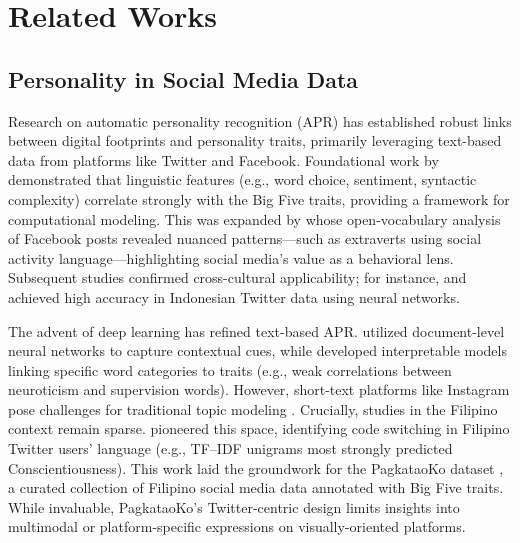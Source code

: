 %
%
%                 

\chapter{Related Works}
\label{sec:Related Works}


\section{Personality in Social Media Data}
\label{sec:Personality}
Research on automatic personality recognition (APR) has established robust links between digital footprints and personality traits, primarily leveraging text-based data from platforms like Twitter and Facebook. Foundational work by \citet{mairesse_using_2007} demonstrated that linguistic features (e.g., word choice, sentiment, syntactic complexity) correlate strongly with the Big Five traits, providing a framework for computational modeling. This was expanded by \citet{schwartz_personality_2013} whose open-vocabulary analysis of Facebook posts revealed nuanced patterns—such as extraverts using social activity language—highlighting social media's value as a behavioral lens. Subsequent studies confirmed cross-cultural applicability; for instance, \citet{adi_optimization_2018} and \citet{jeremy_automatic_2021} achieved high accuracy in Indonesian Twitter data using neural networks.

The advent of deep learning has refined text-based APR. \citet{majumder_deep_2017} utilized document-level neural networks to capture contextual cues, while \citet{han_knowledge_2020} developed interpretable models linking specific word categories to traits (e.g., weak correlations between neuroticism and supervision words). However, short-text platforms like Instagram pose challenges for traditional topic modeling \citep{albalawi_using_2020}. Crucially, studies in the Filipino context remain sparse. \citet{tighe_modeling_2018} pioneered this space, identifying code switching in Filipino Twitter users' language (e.g., TF–IDF unigrams most strongly predicted Conscientiousness). This work laid the groundwork for the PagkataoKo dataset \citep{tighe_acorda_2022}, a curated collection of Filipino social media data annotated with Big Five traits. While invaluable, PagkataoKo's Twitter-centric design limits insights into multimodal or platform-specific expressions on visually-oriented platforms.

